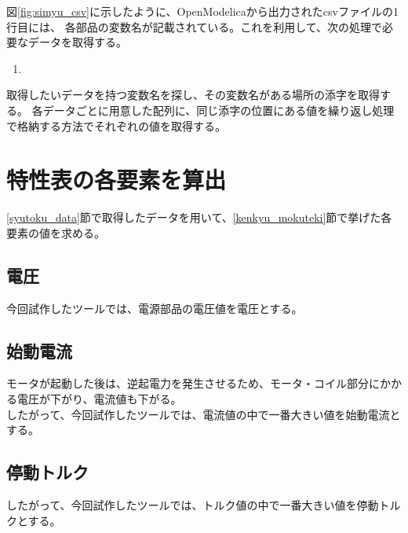 図\ref{fig:simyu_csv}に示したように、OpenModelicaから出力されたcsvファイルの1行目には、
各部品の変数名が記載されている。これを利用して、次の処理で必要なデータを取得する。

\begin{enumerate}
    \item 
\end{enumerate}
取得したいデータを持つ変数名を探し、その変数名がある場所の添字を取得する。
各データごとに用意した配列に、同じ添字の位置にある値を繰り返し処理で格納する方法でそれぞれの値を取得する。

\section{特性表の各要素を算出}\label{keisan}
\ref{syutoku_data}節で取得したデータを用いて、\ref{kenkyu_mokuteki}節で挙げた各要素の値を求める。

\subsection{電圧}\label{sub:keisan_dennatu}
今回試作したツールでは、電源部品の電圧値を電圧とする。

\subsection{始動電流}\label{sub:keisan_sidouden}
モータが起動した後は、逆起電力を発生させるため、モータ・コイル部分にかかる電圧が下がり、電流値も下がる。\\
したがって、今回試作したツールでは、電流値の中で一番大きい値を始動電流とする。

\subsection{停動トルク}\label{sub:keisan_teidoutoruku}
したがって、今回試作したツールでは、トルク値の中で一番大きい値を停動トルクとする。


